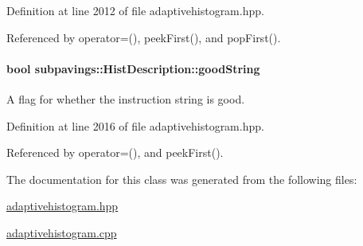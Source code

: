 \-Definition at line 2012 of file adaptivehistogram.\-hpp.



\-Referenced by operator=(), peek\-First(), and pop\-First().

\hypertarget{classsubpavings_1_1HistDescription_a3f246c1b82fb69929ec3761480c934b9}{
\paragraph[{good\-String}]{\setlength{\rightskip}{0pt plus 5cm}bool {\bf subpavings\-::\-Hist\-Description\-::good\-String}}}\label{classsubpavings_1_1HistDescription_a3f246c1b82fb69929ec3761480c934b9}
\-A flag for whether the instruction string is good. 

\-Definition at line 2016 of file adaptivehistogram.\-hpp.



\-Referenced by operator=(), and peek\-First().



\-The documentation for this class was generated from the following files\-:\begin{DoxyCompactItemize}
\item 
\hyperlink{adaptivehistogram_8hpp}{adaptivehistogram.\-hpp}\item 
\hyperlink{adaptivehistogram_8cpp}{adaptivehistogram.\-cpp}\end{DoxyCompactItemize}
